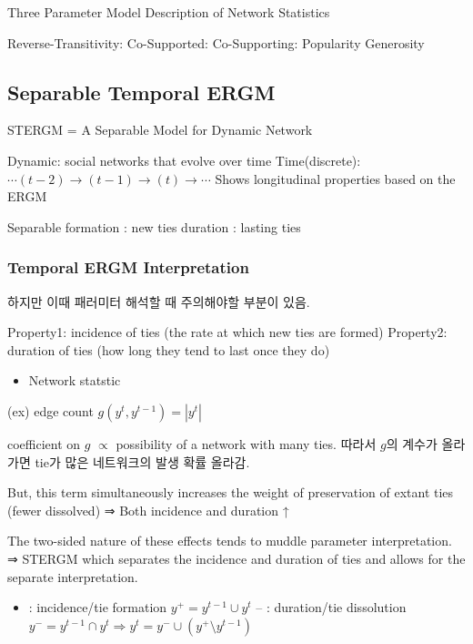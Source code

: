 \documentclass[
]{book}
\providecommand{\tightlist}{%
  \setlength{\itemsep}{0pt}\setlength{\parskip}{0pt}}
\begin{document}
{{{Three Parameter Model
Description of Network Statistics

Reverse-Transitivity:
Co-Supported:
Co-Supporting:
Popularity
Generosity

\hypertarget{separable-temporal-ergm}{%
\subsection{Separable Temporal ERGM}\label{separable-temporal-ergm}}

STERGM = A Separable Model for Dynamic Network

Dynamic: social networks that evolve over time
Time(discrete): \(\cdots (t-2) → (t-1) → (t) → \cdots\)
Shows longitudinal properties based on the ERGM

Separable
formation : new ties
duration : lasting ties

\hypertarget{temporal-ergm-interpretation}{%
\subsubsection{Temporal ERGM Interpretation}\label{temporal-ergm-interpretation}}

하지만 이때 패러미터 해석할 때 주의해야할 부분이 있음.

Property1: incidence of ties (the rate at which new ties are formed)
Property2: duration of ties (how long they tend to last once they do)

\begin{itemize}
\tightlist
\item
  Network statstic
\end{itemize}

(ex) edge count \(g(y^t , y^{t-1}) = | y^t |\)

coefficient on \(g\) \(\propto\) possibility of a network with many ties. 따라서 \(g\)의 계수가 올라가면 tie가 많은 네트워크의 발생 확률 올라감.

But, this term simultaneously increases the weight of preservation of extant ties (fewer dissolved) ⇒ Both incidence and duration ↑

The two-sided nature of these effects tends to muddle parameter interpretation. ⇒ STERGM which separates the incidence and duration of ties and allows for the separate interpretation.

\begin{itemize}
\tightlist
\item
  : incidence/tie formation \(y^+ = y^{t-1} \cup y^t\)
  -- : duration/tie dissolution \(y^- = y^{t-1} \cap y^t \Rightarrow y^t = y^- \cup (y^+ \setminus y^{t-1})\)
\end{itemize}

}}}
\end{document}
